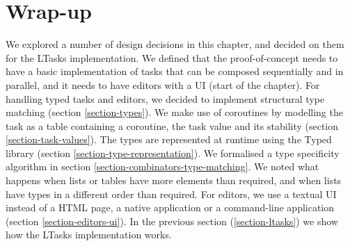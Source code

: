 \section{Wrap-up}\label{section-wrapup}
We explored a number of design decisions in this chapter, and decided on them for the LTasks implementation.
We defined that the proof-of-concept needs to have a basic implementation of tasks that can be composed sequentially and in parallel, and it needs to have editors with a UI (start of the chapter).
For handling typed tasks and editors, we decided to implement structural type matching (section \ref{section-types}).
We make use of coroutines by modelling the task as a table containing a coroutine, the task value and its stability (section \ref{section-task-values}).
The types are represented at runtime using the Typed library (section \ref{section-type-representation}).
We formalised a type specificity algorithm in section \ref{section-combinators-type-matching}. We noted what happens when lists or tables have more elements than required, and when lists have types in a different order than required.
For editors, we use a textual UI instead of a HTML page, a native application or a command-line application (section \ref{section-editors-ui}).
In the previous section (\ref{section-ltasks}) we show how the LTasks implementation works.

